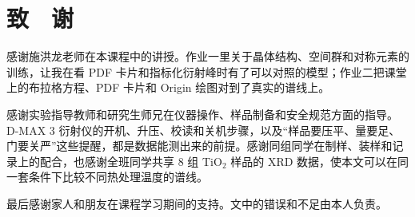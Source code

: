 \section*{致　谢}

感谢施洪龙老师在本课程中的讲授。作业一里关于晶体结构、空间群和对称元素的训练，让我在看 PDF 卡片和指标化衍射峰时有了可以对照的模型；作业二把课堂上的布拉格方程、PDF 卡片和 Origin 绘图对到了真实的谱线上。

感谢实验指导教师和研究生师兄在仪器操作、样品制备和安全规范方面的指导。D-MAX 3 衍射仪的开机、升压、校读和关机步骤，以及“样品要压平、量要足、门要关严”这些提醒，都是数据能测出来的前提。感谢同组同学在制样、装样和记录上的配合，也感谢全班同学共享 8 组 TiO$_2$ 样品的 XRD 数据，使本文可以在同一套条件下比较不同热处理温度的谱线。

最后感谢家人和朋友在课程学习期间的支持。文中的错误和不足由本人负责。
